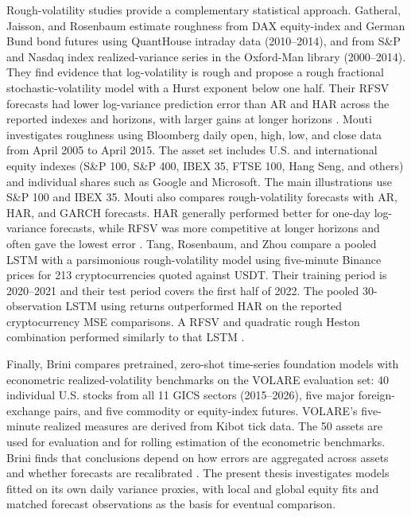 \documentclass[12pt,a4paper]{article}
\numberwithin{equation}{section}
\numberwithin{table}{section}
\numberwithin{figure}{section}
\begin{document}
Rough-volatility studies provide a complementary statistical approach. Gatheral, Jaisson, and Rosenbaum estimate roughness from DAX equity-index and German Bund bond futures using QuantHouse intraday data (2010--2014), and from S\&P and Nasdaq index realized-variance series in the Oxford-Man library (2000--2014). They find evidence that log-volatility is rough and propose a rough fractional stochastic-volatility model with a Hurst exponent below one half. Their RFSV forecasts had lower log-variance prediction error than AR and HAR across the reported indexes and horizons, with larger gains at longer horizons \cite{gatheral2018}. Mouti investigates roughness using Bloomberg daily open, high, low, and close data from April 2005 to April 2015. The asset set includes U.S. and international equity indexes (S\&P 100, S\&P 400, IBEX 35, FTSE 100, Hang Seng, and others) and individual shares such as Google and Microsoft. The main illustrations use S\&P 100 and IBEX 35. Mouti also compares rough-volatility forecasts with AR, HAR, and GARCH forecasts. HAR generally performed better for one-day log-variance forecasts, while RFSV was more competitive at longer horizons and often gave the lowest error \cite{mouti2023}. Tang, Rosenbaum, and Zhou compare a pooled LSTM with a parsimonious rough-volatility model using five-minute Binance prices for 213 cryptocurrencies quoted against USDT. Their training period is 2020--2021 and their test period covers the first half of 2022. The pooled 30-observation LSTM using returns outperformed HAR on the reported cryptocurrency MSE comparisons. A RFSV and quadratic rough Heston combination performed similarly to that LSTM \cite{tang2023}.

Finally, Brini compares pretrained, zero-shot time-series foundation models with econometric realized-volatility benchmarks on the VOLARE evaluation set: 40 individual U.S. stocks from all 11 GICS sectors (2015--2026), five major foreign-exchange pairs, and five commodity or equity-index futures. VOLARE's five-minute realized measures are derived from Kibot tick data. The 50 assets are used for evaluation and for rolling estimation of the econometric benchmarks. Brini finds that conclusions depend on how errors are aggregated across assets and whether forecasts are recalibrated \cite{brini2026}. The present thesis investigates models fitted on its own daily variance proxies, with local and global equity fits and matched forecast observations as the basis for eventual comparison.  
\end{document}
